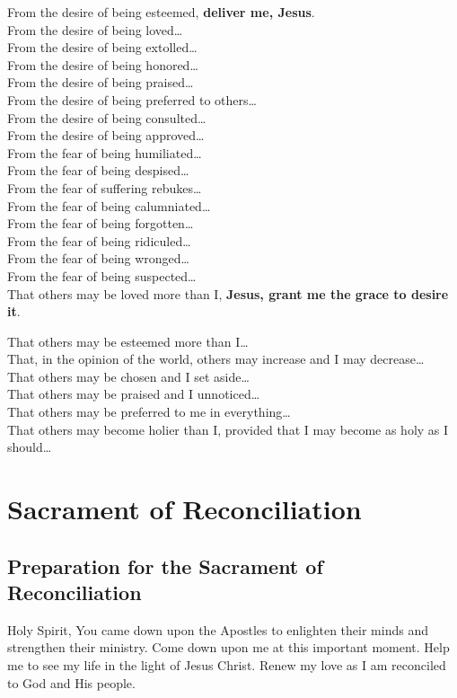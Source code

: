 \documentclass[12pt]{article}
\newcommand{\prayersection}[1]{\section{#1}}
\newcommand{\prayertitle}[1]{\subsection{#1}}
\begin{document}
From the desire of being esteemed, \textbf{deliver me, Jesus}.\\
From the desire of being loved\ldots\\
From the desire of being extolled\ldots\\
From the desire of being honored\ldots\\
From the desire of being praised\ldots\\
From the desire of being preferred to others\ldots\\
From the desire of being consulted\ldots\\
From the desire of being approved\ldots\\
From the fear of being humiliated\ldots\\
From the fear of being despised\ldots\\
From the fear of suffering rebukes\ldots\\
From the fear of being calumniated\ldots\\
From the fear of being forgotten\ldots\\
From the fear of being ridiculed\ldots\\
From the fear of being wronged\ldots\\
From the fear of being suspected\ldots\\

That others may be loved more than I, \textbf{Jesus, grant me the grace to desire it}.

That others may be esteemed more than I\ldots\\
That, in the opinion of the world, others may increase and I may decrease\ldots\\
That others may be chosen and I set aside\ldots\\
That others may be praised and I unnoticed\ldots\\
That others may be preferred to me in everything\ldots\\
That others may become holier than I, provided that I may become as holy as I should\ldots\\

\newpage

\prayersection{Sacrament of Reconciliation}
\prayertitle{Preparation for the Sacrament of Reconciliation}
Holy Spirit,
You came down upon the Apostles to enlighten their minds and strengthen their ministry.
Come down upon me at this important moment.
Help me to see my life in the light of Jesus Christ.
Renew my love as I am reconciled to God and His people.
\end{document}
